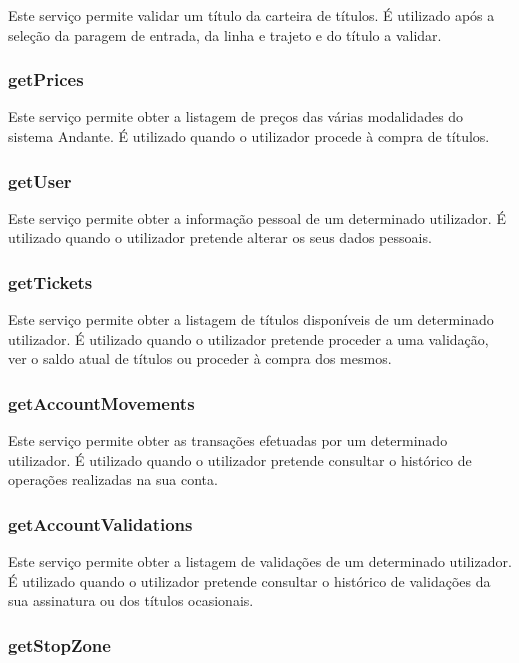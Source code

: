Este serviço permite validar um título da carteira de títulos. É utilizado após a seleção da paragem de entrada, da linha e trajeto e do título a validar.

\subsubsection{getPrices}

Este serviço permite obter a listagem de preços das várias modalidades do sistema Andante. É utilizado quando o utilizador procede à compra de títulos.

\subsubsection{getUser}

Este serviço permite obter a informação pessoal de um determinado utilizador. É utilizado quando o utilizador pretende alterar os seus dados pessoais.

\subsubsection{getTickets}

Este serviço permite obter a listagem de títulos disponíveis de um determinado utilizador. É utilizado quando o utilizador pretende proceder a uma validação, ver o saldo atual de títulos ou proceder à compra dos mesmos.

\subsubsection{getAccountMovements}

Este serviço permite obter as transações efetuadas por um determinado utilizador. É utilizado quando o utilizador pretende consultar o histórico de operações realizadas na sua conta.

\subsubsection{getAccountValidations}

Este serviço permite obter a listagem de validações de um determinado utilizador. É utilizado quando o utilizador pretende consultar o histórico de validações da sua assinatura ou dos títulos ocasionais.

\subsubsection{getStopZone}

